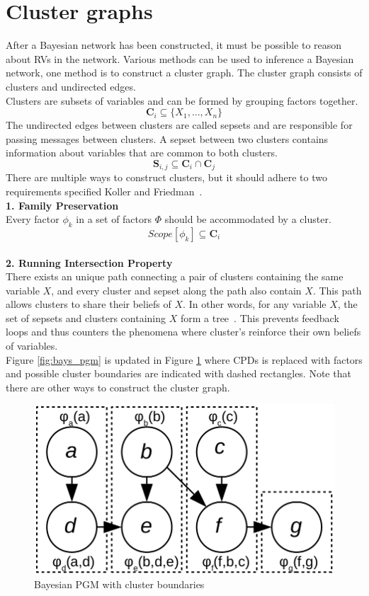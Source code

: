 \documentclass[12pt,oneside,openany,a4paper, %
afrikaans,english,
]{memoir}
\numberwithin{equation}{chapter}
\begin{document}
\section{Cluster graphs}
After a Bayesian network has been constructed, it must be possible to reason about RVs in the network. Various methods can be used to inference a Bayesian network, one method is to construct a cluster graph. The cluster graph consists of clusters and undirected edges.\\Clusters are subsets of variables and can be formed by grouping factors together.\\
\begin{equation}
\bm{C}_i \subseteq \{X_1, ..., X_n\}
\end{equation}
The undirected edges between clusters are called sepsets and are responsible for passing messages between clusters. A sepset between two clusters contains information about variables that are common to both clusters.
\begin{equation}
\bm{S}_{i,j} \subseteq \bm{C}_i \cap \bm{C}_j
\end{equation}
There are multiple ways to construct clusters, but it should adhere to two requirements specified Koller and Friedman~\citep{koller}.\\
\textbf{1. Family Preservation}\\
Every factor $\phi_k$ in a set of factors $\Phi$ should be accommodated by a cluster.
\begin{equation}
Scope[{\phi}_k] \subseteq \bm{C}_i
\end{equation}\\
\textbf{2. Running Intersection Property}\\
There exists an unique path connecting a pair of clusters containing the same variable $X$, and every cluster and sepset along the path also contain $X$. This path allows clusters to share their beliefs of $X$. In other words, for any variable $X$, the set of sepsets and clusters containing $X$ form a tree~\citep{koller}. This prevents feedback loops and thus counters the phenomena where cluster's reinforce their own beliefs of variables.\\
Figure \ref{fig:bays_pgm} is updated in Figure \ref{fig:cluster_bound} where CPDs is replaced with factors and possible cluster boundaries are indicated with dashed rectangles. Note that there are other ways to construct the cluster graph.
\begin{figure}[H]
  \includegraphics[width=0.6\linewidth]{Figures/cluster_divisions.png}
  \centering
  \caption{Bayesian PGM with cluster boundaries}
  \label{fig:cluster_bound}
\end{figure}
\end{document}
